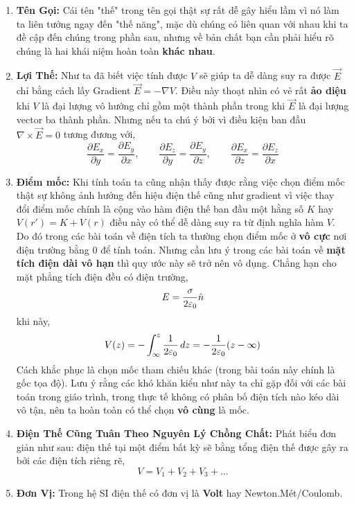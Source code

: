 \begin{enumerate}
\begin{enumerate}
\item \textbf{Tên Gọi:} Cái tên "thế" trong tên gọi thật sự rất dễ gây hiểu lầm vì nó làm ta liên tưởng ngay đến "thế năng", mặc dù chúng có liên quan với nhau khi ta đề cập đến chúng trong phần sau, nhưng về bản chất bạn cần phải hiểu rõ chúng là hai khái niệm hoàn toàn \textbf{khác nhau}.

\item \textbf{Lợi Thế:} Như ta đã biết việc tính được $V$ sẽ giúp ta dễ dàng suy ra được $\vec{E}$ chỉ bằng cách lấy Gradient $\vec{E} = -\nabla V$. Điều này thoạt nhìn có vẻ rất \textbf{ảo diệu} khi $V$ là đại lượng vô hướng chỉ gồm một thành phần trong khi $\vec{E}$ là đại lượng vector ba thành phần. Nhưng nếu ta chú ý bởi vì điều kiện ban đầu $\nabla \times \vec{E} = 0$ tương đương với,
\[
\frac{\partial{E_{x}}}{\partial{y}} = \frac{\partial{E_{y}}}{\partial{x}},
\qquad
\frac{\partial{E_{z}}}{\partial{y}} = \frac{\partial{E_{y}}}{\partial{z}},
\qquad
\frac{\partial{E_{x}}}{\partial{z}} = \frac{\partial{E_{z}}}{\partial{x}}
\]

\item \textbf{Điểm mốc:} Khi tính toán ta cũng nhận thấy được rằng việc chọn điểm mốc thật sự không ảnh hướng đến hiệu điện thế cũng như gradient vì việc thay đổi điểm mốc chính là cộng vào hàm điện thế ban đầu một hằng số $K$ hay $V(r') = K + V(r)$ điều này có thể dễ dàng suy ra từ định nghĩa hàm $V$. Do đó trong các bài toán về điện tích ta thường chọn điểm mốc ở \textbf{vô cực} nơi điện trường bằng 0 để tính toán. Nhưng cần lưu ý trong các bài toán về \textbf{mặt tích điện dài vô hạn} thì quy ước này sẽ trở nên vô dụng. Chẳng hạn cho mặt phẳng tích điện đều có điện trường,
\[
 E = \frac{\sigma}{2\varepsilon_{0}}\hat{n}
\]
khi này,
\[
V(z) = -\int_{\infty}^{z} \frac{1}{2\varepsilon_{0}} \, dz = -\frac{1}{2\varepsilon_{0}}(z - \infty)
\]
Cách khắc phục là chọn mốc tham chiếu khác (trong bài toán này chính là gốc tọa độ). Lưu ý rằng các khó khăn kiểu như này ta chỉ gặp đối với các bài toán trong giáo trình, trong thực tế không có phân bố điện tích nào kéo dài vô tận, nên ta hoàn toàn có thể chọn \textbf{vô cùng} là mốc.
\item \textbf{Điện Thế Cũng Tuân Theo Nguyên Lý Chồng Chất:} Phát biểu đơn giản như sau: điện thế tại một điểm bất kỳ sẽ bằng tổng điện thế được gây ra bởi các điện tích riêng rẽ,
\[
V = V_{1} + V_{2} + V_{3} + ...
\]
\item \textbf{Đơn Vị:} Trong hệ SI điện thế có đơn vị là \textbf{Volt} hay Newton.Mét/Coulomb.
\end{enumerate}


\end{enumerate}
